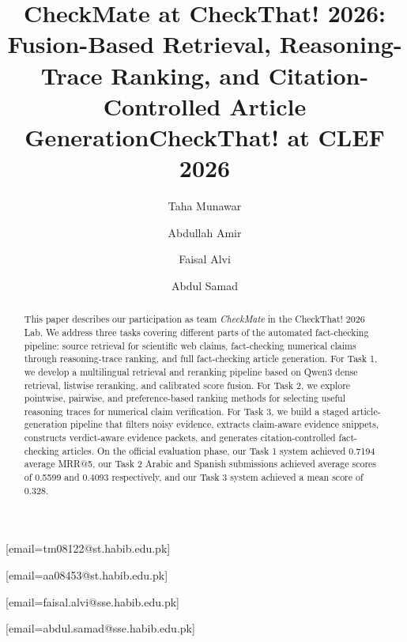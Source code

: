 \documentclass[
]{ceurart}
\begin{document}

\title{CheckMate at CheckThat! 2026: Fusion-Based Retrieval, Reasoning-Trace Ranking, and Citation-Controlled Article Generation}

\title[mode=sub]{CheckThat! at CLEF 2026}



\author[1]{Taha Munawar}[email=tm08122@st.habib.edu.pk]
\cormark[1]

\author[1]{Abdullah Amir}[email=aa08453@st.habib.edu.pk]

\author[1]{Faisal Alvi}[email=faisal.alvi@sse.habib.edu.pk]

\author[1]{Abdul Samad}[email=abdul.samad@sse.habib.edu.pk]

\address[1]{Dhanani School of Science and Engineering, Habib University, Karachi, Pakistan}


\begin{abstract}
  This paper describes our participation as team \textit{CheckMate} in the CheckThat! 2026 Lab. We address three tasks covering different parts of the automated fact-checking pipeline: source retrieval for scientific web claims, fact-checking numerical claims through reasoning-trace ranking, and full fact-checking article generation. For Task 1, we develop a multilingual retrieval and reranking pipeline based on Qwen3 dense retrieval, listwise reranking, and calibrated score fusion. For Task 2, we explore pointwise, pairwise, and preference-based ranking methods for selecting useful reasoning traces for numerical claim verification. For Task 3, we build a staged article-generation pipeline that filters noisy evidence, extracts claim-aware evidence snippets, constructs verdict-aware evidence packets, and generates citation-controlled fact-checking articles. On the official evaluation phase, our Task 1 system achieved 0.7194 average MRR@5, our Task 2 Arabic and Spanish submissions achieved average scores of 0.5599 and 0.4093 respectively, and our Task 3 system achieved a mean score of 0.328.
\end{abstract}
\end{document}

